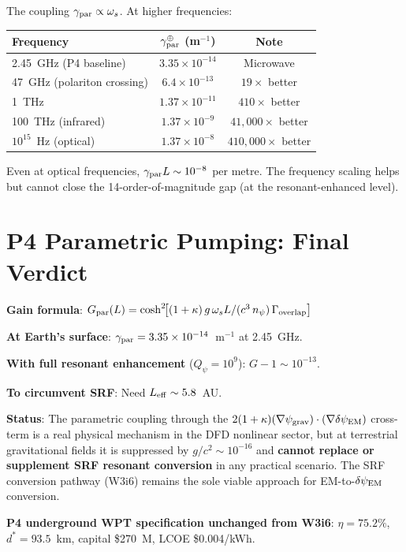 \documentclass[11pt]{article}
\newcommand{\ee}[1]{\times 10^{#1}}
\newcommand{\psigrav}{\psi_{\rm grav}}
\newcommand{\dpsiEM}{\delta\psi_{\rm EM}}
\newcommand{\Qpsi}{Q_\psi}
\newcommand{\npsi}{n_\psi}
\begin{document}
The coupling $\gamma_{\rm par} \propto \omega_s$. At higher frequencies:
\begin{center}
\begin{tabular}{lcc}
\toprule
Frequency & $\gamma_{\rm par}^{\oplus}$ (m$^{-1}$) & Note \\
\midrule
2.45~GHz (P4 baseline) & $3.35\ee{-14}$ & Microwave \\
47~GHz (polariton crossing) & $6.4\ee{-13}$ & $19\times$ better \\
1~THz & $1.37\ee{-11}$ & $410\times$ better \\
100~THz (infrared) & $1.37\ee{-9}$ & $41{,}000\times$ better \\
$10^{15}$~Hz (optical) & $1.37\ee{-8}$ & $410{,}000\times$ better \\
\bottomrule
\end{tabular}
\end{center}

Even at optical frequencies, $\gamma_{\rm par}L \sim 10^{-8}$ per metre.
The frequency scaling helps but cannot close the 14-order-of-magnitude
gap (at the resonant-enhanced level).

\section{P4 Parametric Pumping: Final Verdict}
\label{sec:P4-verdict}

\begin{tcolorbox}[colback=red!5!white, colframe=red!60!black,
  title=\textbf{P4 Parametric Pumping: Not Viable at Terrestrial Gravity}]

\textbf{Gain formula}:
$G_{\rm par}(L) = \cosh^2\!\bigl[(1+\kappa)\,g\,\omega_s L/(c^3\,\npsi)
\,\Gamma_{\rm overlap}\bigr]$

\textbf{At Earth's surface}: $\gamma_{\rm par} = 3.35\ee{-14}$~m$^{-1}$
at 2.45~GHz.

\textbf{With full resonant enhancement} ($\Qpsi = 10^9$):
$G - 1 \sim 10^{-13}$.

\textbf{To circumvent SRF}: Need $L_{\rm eff} \sim 5.8$~AU.

\textbf{Status}: The parametric coupling through the
$2(1+\kappa)(\nabla\psigrav)\cdot(\nabla\dpsiEM)$ cross-term is a
real physical mechanism in the DFD nonlinear sector, but at terrestrial
gravitational fields it is suppressed by $g/c^2 \sim 10^{-16}$ and
\textbf{cannot replace or supplement SRF resonant conversion} in any
practical scenario. The SRF conversion pathway (W3i6) remains the
sole viable approach for EM-to-$\dpsiEM$ conversion.

\textbf{P4 underground WPT specification unchanged from W3i6}:
$\eta = 75.2\%$, $d^* = 93.5$~km, capital \$270~M, LCOE \$0.004/kWh.
\end{tcolorbox}
\end{document}
